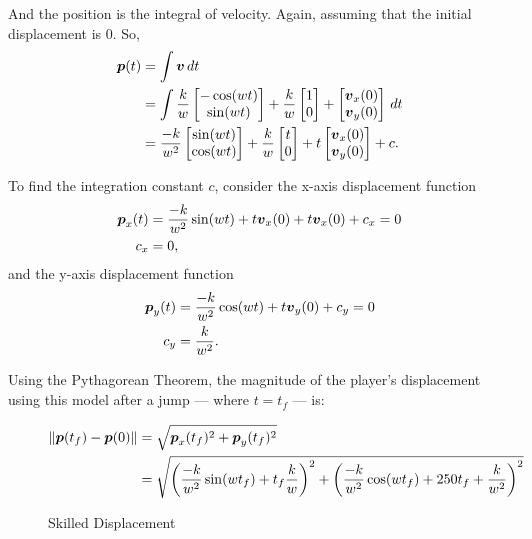 And the position is the integral of velocity. Again, assuming that the initial displacement is $0$. So,
\begin{align*}
    \boldsymbol{p}(t) &= \int \boldsymbol{v} \, dt\\
    &= \int \frac{k}{w} \begin{bmatrix}-\cos(wt)\\\sin(wt) \end{bmatrix} + \frac{k}{w}\begin{bmatrix}1\\0 \end{bmatrix} + \begin{bmatrix}\boldsymbol{v}_x(0)\\\boldsymbol{v}_y(0) \end{bmatrix} \, dt\\
    &= \frac{-k}{w^2} \begin{bmatrix}\sin(wt)\\\cos(wt) \end{bmatrix} + \frac{k}{w}\begin{bmatrix}t\\0 \end{bmatrix}  + t\begin{bmatrix}\boldsymbol{v}_x(0)\\\boldsymbol{v}_y(0) \end{bmatrix} + c.
\end{align*}

To find the integration constant $c$, consider the x-axis displacement function
\begin{align*}
    \boldsymbol{p}_x(t) &= \frac{-k}{w^2} \sin(wt) + t\boldsymbol{v}_x(0) + t\boldsymbol{v}_x(0) + c_x = 0\\
    c_x &= 0,
\end{align*}
and the y-axis displacement function
\begin{align*}
    \boldsymbol{p}_y(t) &= \frac{-k}{w^2} \cos(wt) + t\boldsymbol{v}_y(0) + c_y = 0\\
    c_y &= \frac{k}{w^2}.
\end{align*}

Using the Pythagorean Theorem, the magnitude of the player's displacement using this model after a jump --- where $t=t_f$ --- is:
\begin{figure}[H]
    \centering
    \begin{align*}
        \|\boldsymbol{p}(t_f) - \boldsymbol{p}(0)\| &= \sqrt{\boldsymbol{p}_x(t_f)^2 + \boldsymbol{p}_y(t_f)^2}\\
        &= \sqrt{\left(\frac{-k}{w^2}\sin(wt_f) + t_f\frac{k}{w} \right)^2 + \left( \frac{-k}{w^2}\cos(wt_f) + 250t_f + \frac{k}{w^2} \right)^2}
    \end{align*}
    \caption{Skilled Displacement}
    \label{eq:2skilled_displacement}

\end{figure}

